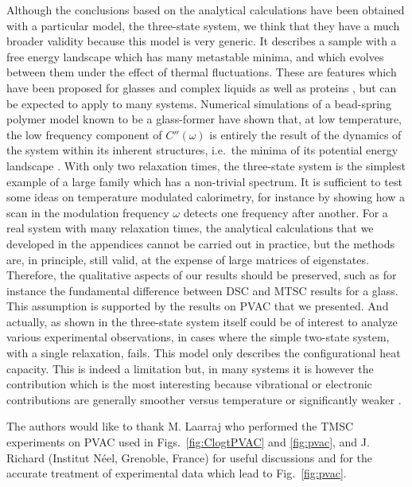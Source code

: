 \documentclass[pre,a4paper,twocolumn,superscriptaddress,%
floatfix]{revtex4}
\begin{document}
\medskip
Although the conclusions based on the analytical calculations have been
obtained with a particular model, the three-state system, we think that they
have a much broader validity because this model is very generic. It describes
a sample with a free energy landscape which has many metastable minima, and
which evolves between them under the effect of thermal fluctuations.
These are features which have been proposed for glasses and complex liquids
\cite{STILLINGER-82} as well as proteins \cite{NAKAGAWA}, but can be expected
to apply to many systems.
Numerical simulations of a bead-spring polymer model
known to be a glass-former have shown that, at low temperature, the low
frequency component of $C''(\omega)$ is entirely the result of
the dynamics of the system within
its inherent structures, i.e.\ the minima of its potential energy landscape
\cite{BROWN-JR2011}. With only two relaxation
times, the three-state system is the simplest example of a
large family which has a non-trivial spectrum. It is sufficient to test some
ideas on temperature modulated calorimetry, for 
instance by showing how a scan in the modulation frequency $\omega$ detects
one frequency after another. For a real system with many relaxation times, the
analytical calculations that we developed
in the appendices cannot be carried out in
practice, but the methods are, in principle, still valid, at the expense of
large matrices of eigenstates. Therefore, the qualitative aspects of
our results should be preserved, such as for instance the fundamental
difference 
between DSC and MTSC results for a glass.
This assumption is supported by the results on
PVAC that we presented. And actually, as shown in \cite{PG} the three-state
system itself could be of interest to analyze various experimental
observations, in cases where the simple two-state system, with a single
relaxation, fails.
This model only describes the configurational heat
capacity. This is indeed a limitation but, in many systems it is however the
contribution which is the most interesting because vibrational or electronic
contributions are generally smoother versus temperature or significantly
weaker \cite{TOMBARI2007}.


\begin{acknowledgments}
  The authors would like to thank M. Laarraj who performed the TMSC
  experiments on PVAC used in Figs.~\ref{fig:ClogtPVAC}
  and \ref{fig:pvac}, and J. Richard
  (Institut Néel, Grenoble, France) for useful discussions
  and for the accurate treatment of experimental data 
which lead to Fig.~\ref{fig:pvac}.
\end{acknowledgments}
\end{document}
